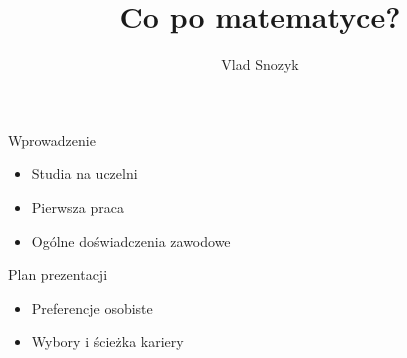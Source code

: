 \documentclass{beamer}
\title{Co po matematyce?}
\author{Vlad Snozyk}
\date{}
\begin{document}
\begin{frame}
  \titlepage
\end{frame}

\begin{frame}{Wprowadzenie}
  \begin{itemize}
    \item Studia na uczelni
    \item Pierwsza praca
    \item Ogólne doświadczenia zawodowe
  \end{itemize}
\end{frame}

\begin{frame}{Plan prezentacji}
  \begin{itemize}
    \item Preferencje osobiste
    \item Wybory i ścieżka kariery
  \end{itemize}
\end{frame}
\end{document}
